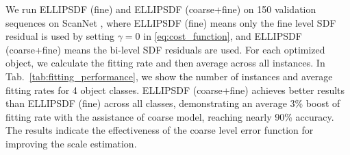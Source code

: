 \begin{table}[t]
    \centering
    \caption{Quantitative results for shape evlaution on ScanNet\cite{dai2017scannet}.}\label{tab:fitting_performance}
\end{table}

We run ELLIPSDF (fine) and ELLIPSDF (coarse+fine) on 150 validation sequences on ScanNet \cite{dai2017scannet}, where ELLIPSDF (fine) means only the fine level SDF residual is used by setting $\gamma = 0$ in \eqref{eq:cost_function}, and ELLIPSDF (coarse+fine) means the bi-level SDF residuals are used. For each optimized object, we calculate the fitting rate and then average across all instances. In Tab.~\ref{tab:fitting_performance}, we show the number of instances and average fitting rates for 4 object classes.
ELLIPSDF (coarse+fine) achieves better results than ELLIPSDF (fine) across all classes, demonstrating an average 3\% boost of fitting rate with the assistance of coarse model, reaching nearly 90\% accuracy. The results indicate the effectiveness of the coarse level error function for improving the scale estimation. 






